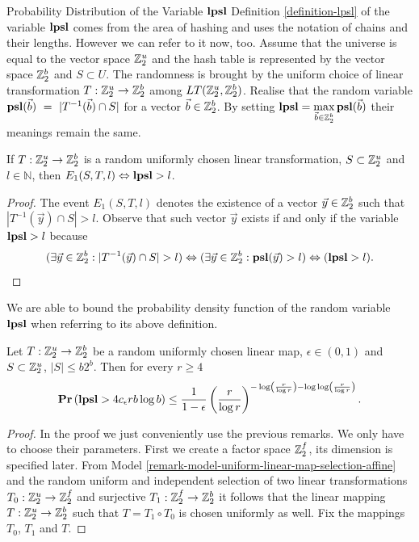 \begin{section}{Probability Distribution of the Variable \texorpdfstring{$\mathbf{lpsl}$}{lpsl}}
Definition \ref{definition-lpsl} of the variable $\mathbf{lpsl}$ comes from the area of hashing and uses the notation of chains and their lengths. However we can refer to it now, too. Assume that the universe is equal to the vector space $\mathbb{Z}_{2}^{u}$ and the hash table is represented by the vector space $\mathbb{Z}_{2}^{b}$ and $S \subset U$. The randomness is brought by the uniform choice of linear transformation $T: \mathbb{Z}_{2}^{u} \rightarrow \mathbb{Z}_{2}^{b}$ among $LT(\mathbb{Z}_{2}^{u}, \mathbb{Z}_{2}^{b})$. Realise that the random variable $\mathbf{psl}(\vec{b})~=~|T^{-1}(\vec{b}) \cap S|$ for a vector $\vec{b} \in \mathbb{Z}_{2}^{b}$. By setting $\mathbf{lpsl} = \displaystyle\max_{\vec{b} \in \mathbb{Z}_{2}^{b}} \mathbf{psl}(\vec{b})$ their meanings remain the same. 

\begin{lemma}
\label{lemma-e1-lpsl-equivalence}
If $T: \mathbb{Z}_{2}^{u} \rightarrow \mathbb{Z}_{2}^{b}$ is a random uniformly chosen linear transformation, $S \subset \mathbb{Z}_{2}^{u}$ and $l \in \mathbb{N}$, then $E_1(S, T, l) \Leftrightarrow \mathbf{lpsl} > l$.
\end{lemma}
\begin{proof}
The event $E_1(S, T, l)$ denotes the existence of a vector $\vec{y} \in \mathbb{Z}_{2}^{b}$ such that $|T^{-1}(\vec{y}) \cap S| > l$. Observe that such vector $\vec{y}$ exists if and only if the variable $\mathbf{lpsl} > l$ because
\[
(\exists \vec{y} \in \mathbb{Z}_{2}^{b}: |T^{-1}(\vec{y}) \cap S| > l) \Leftrightarrow (\exists \vec{y} \in \mathbb{Z}_{2}^{b}: \mathbf{psl}(\vec{y}) > l) \Leftrightarrow (\mathbf{lpsl} > l) \text{.}
\] 
\end{proof}

We are able to bound the probability density function of the random variable $\mathbf{lpsl}$ when referring to its above definition.
\begin{remark}
\label{remark-probability-long-chain}
Let $T: \mathbb{Z}_{2}^{u} \rightarrow \mathbb{Z}_{2}^{b}$ be a random uniformly chosen linear map, $\epsilon \in (0, 1)$ and $S \subset \mathbb{Z}_{2}^{u}$, $|S| \leq b 2 ^ b$. Then for every $r \geq 4$
\[
	\mathbf{Pr}\left(\mathbf{lpsl} > 4 c_\epsilon r b \log b\right) \leq \frac{1}{1 - \epsilon} \left(\frac{r}{\log r}\right)^{-\log \left(\frac{r}{\log r}\right) - \log \log \left(\frac{r}{\log r}\right)} \text{.}
\]
\end{remark}
\begin{proof}
In the proof we just conveniently use the previous remarks. We only have to choose their parameters. First we create a factor space $\mathbb{Z}_{2}^{f}$, its dimension is specified later. From Model \ref{remark-model-uniform-linear-map-selection-affine} and the random uniform and independent selection of two linear transformations $T_0: \mathbb{Z}_{2}^{u} \rightarrow \mathbb{Z}_{2}^{f}$ and surjective $T_1: \mathbb{Z}_{2}^{f} \rightarrow \mathbb{Z}_{2}^{b}$ it follows that the linear mapping $T: \mathbb{Z}_{2}^{u} \rightarrow \mathbb{Z}_{2}^{b}$ such that $T = T_1 \circ T_0$ is chosen uniformly as well. Fix the mappings $T_0$, $T_1$ and $T$.


\end{proof}
\end{section}
